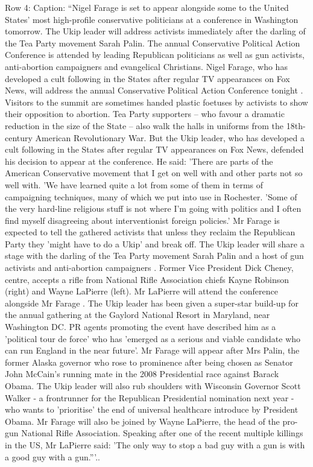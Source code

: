 \begin{table}[H]
\centering
\caption{Row 4\ifshowcaption{}: Caption: ``Nigel Farage is set to appear alongside some to the United States' most high-profile conservative politicians at a conference in Washington tomorrow. The Ukip leader will address activists immediately after the darling of the Tea Party movement Sarah Palin. The annual Conservative Political Action Conference is attended by leading Republican politicians as well as gun activists, anti-abortion campaigners and evangelical Christians. Nigel Farage, who has developed a cult following in the States after regular TV appearances on Fox News, will address the annual Conservative Political Action Conference tonight . Visitors to the summit are sometimes handed plastic foetuses by activists to show their opposition to abortion. Tea Party supporters – who favour a dramatic reduction in the size of the State – also walk the halls in uniforms from the 18th-century American Revolutionary War. But the Ukip leader, who has developed a cult following in the States after regular TV appearances on Fox News, defended his decision to appear at the conference. He said: 'There are parts of the American Conservative movement that I get on well with and other parts not so well with. 'We have learned quite a lot from some of them in terms of campaigning techniques, many of which we put into use in Rochester. 'Some of the very hard-line religious stuff is not where I'm going with politics and I often find myself disagreeing about interventionist foreign policies.' Mr Farage is expected to tell the gathered activists that unless they reclaim the Republican Party they 'might have to do a Ukip' and break off. The Ukip leader will share a stage with the darling of the Tea Party movement Sarah Palin and a host of gun activists and anti-abortion campaigners . Former Vice President Dick Cheney, centre, accepts a rifle from National Rifle Association chiefs Kayne Robinson (right) and Wayne LaPierre (left). Mr LaPierre will attend the conference alongside Mr Farage . The Ukip leader has been given a super-star build-up for the annual gathering at the Gaylord National Resort in Maryland, near Washington DC. PR agents promoting the event have described him as a 'political tour de force' who has 'emerged as a serious and viable candidate who can run England in the near future'. Mr Farage will appear after Mrs Palin, the former Alaska governor who rose to prominence after being chosen as Senator John McCain's running mate in the 2008 Presidential race against Barack Obama. The Ukip leader will also rub shoulders with Wisconsin Governor Scott Walker - a frontrunner for the Republican Presidential nomination next year - who wants to 'prioritise' the end of universal healthcare introduce by President Obama. Mr Farage will also be joined by Wayne LaPierre, the head of the pro-gun National Rifle Association. Speaking after one of the recent multiple killings in the US, Mr LaPierre said: 'The only way to stop a bad guy with a gun is with a good guy with a gun.'''.\else.\fi}

\end{table}

